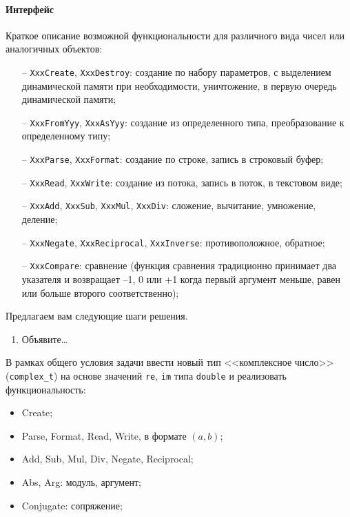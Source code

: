 \paragraph{Интерфейс}
Краткое описание возможной функциональности для различного вида чисел или
аналогичных объектов:
%
\begin{itemize}
%
\item[--] \texttt{XxxCreate}, \texttt{XxxDestroy}: создание по набору параметров, с выделением динамической памяти при необходимости, уничтожение, в первую очередь динамической памяти;
%
\item[--] \texttt{XxxFromYyy}, \texttt{XxxAsYyy}: создание из определенного типа, преобразование к определенному типу;
%
\item[--] \texttt{XxxParse}, \texttt{XxxFormat}: создание по строке, запись в строковый буфер;
%
\item[--] \texttt{XxxRead}, \texttt{XxxWrite}: создание из потока, запись в поток, в текстовом виде;
%
\item[--] \texttt{XxxAdd}, \texttt{XxxSub}, \texttt{XxxMul}, \texttt{XxxDiv}: сложение, вычитание, умножение, деление;
%
\item[--] \texttt{XxxNegate}, \texttt{XxxReciprocal}, \texttt{XxxInverse}: противоположное, обратное;
%
\item[--] \texttt{XxxCompare}: сравнение (функция сравнения традиционно принимает два указателя и возвращает –1, 0 или +1 когда первый аргумент меньше, равен или больше второго соответственно);
%
\end{itemize}


\zzsectionPLAN


Предлагаем вам следующие шаги решения.

\begin{enumerate}
\item Объявите\dots
%
\end{enumerate}



\zzsectionVARIATIONS


\begin{zztask}
В рамках общего условия задачи ввести новый тип <<комплексное число>>
(\texttt{complex\_t}) на основе значений \texttt{re}, \texttt{im} типа
\texttt{double} и реализовать функциональность:
%
\begin{itemize}
\item Create;
\item Parse, Format, Read, Write, в формате $(a, b)$;
\item Add, Sub, Mul, Div, Negate, Reciprocal;
\item Abs, Arg: модуль, аргумент;
\item Conjugate: сопряжение;
\end{itemize}
\end{zztask}

